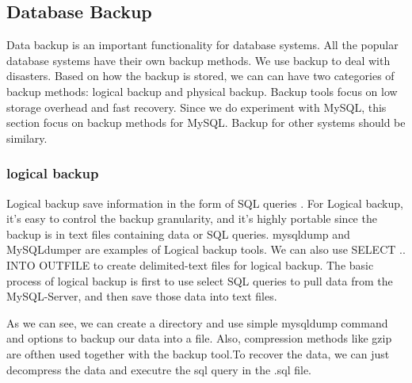 \subsection{Database Backup}

Data backup is an important functionality for database systems. All the popular database systems have their own backup methods. We use backup to deal with disasters. Based on how the backup is stored, we can can have two categories of backup methods: logical backup and physical backup. Backup tools focus on low storage overhead and fast recovery. Since we do experiment with MySQL, this section focus on backup methods for MySQL. Backup for other systems should be similary.



\subsubsection{logical backup}

Logical backup save information in the form of SQL queries \citep{mysqlbackupdocumentation}.  For Logical backup, it's easy to control the backup granularity, and it's highly portable since the backup is in text files containing data or SQL queries. mysqldump \citep{mysqldump-doc} and MySQLdumper\citep{mysqldumpper} are examples of Logical backup tools. We can also use SELECT .. INTO OUTFILE \citep{select-into-mysql-doc} to create delimited-text files for logical backup. The basic process of logical backup is first to use select SQL queries to pull data from the MySQL-Server, and then save those data into text files.






As we can see, we can create a directory and use simple mysqldump command and options to backup our data into a file. Also, compression methods like gzip are ofthen used together with the backup tool.To recover the data, we can just decompress the data and executre the sql query in the .sql file. 

